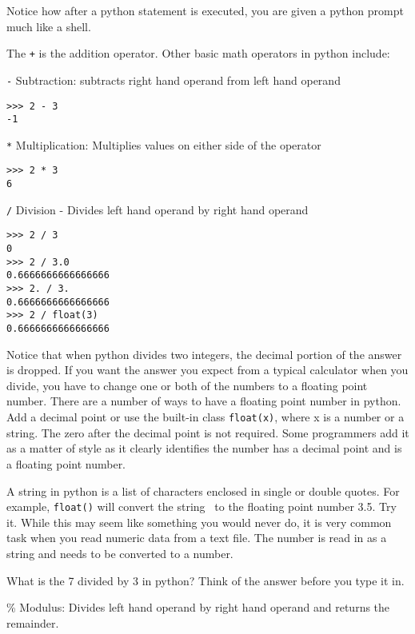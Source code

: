 \documentclass[12pt]{article}
\begin{document}
Notice how after a python statement is executed, you are given a python prompt much like a shell.

The \texttt{+} is the addition operator. Other basic math operators in python include:

\texttt{-} Subtraction: subtracts right hand operand from left hand operand

\begin{lstlisting}[style=bash]
>>> 2 - 3
-1
\end{lstlisting}

\texttt{*} Multiplication: Multiplies values on either side of the operator

\begin{lstlisting}[style=bash]
>>> 2 * 3
6
\end{lstlisting}


\texttt{/} Division - Divides left hand operand by right hand operand

\begin{lstlisting}[style=bash]
>>> 2 / 3
0
>>> 2 / 3.0
0.6666666666666666
>>> 2. / 3.
0.6666666666666666
>>> 2 / float(3)
0.6666666666666666
\end{lstlisting}

Notice that when python divides two integers, the decimal portion of the answer is dropped. If you want the answer you expect from a typical calculator when you divide, you have to change one or both of the numbers to a floating point number. There are a number of ways to have a floating point number in python. Add a decimal point or use the built-in class \texttt{float(x)}, where x is a number or a string. The zero after the decimal point is not required. Some programmers add it as a matter of style as it clearly identifies the number has a decimal point and is a floating point number.

A string in python is a list of characters enclosed in single or double quotes. For example, \texttt{float(\textquotesingle)} will convert the string \textquotesingle $\,$ to the floating point number 3.5. Try it. While this may seem like something you would never do, it is very common task when you read numeric data from a text file. The number is read in as a string and needs to be converted to a number. 

What is the 7 divided by 3 in python? Think of the answer before you type it in. 

\% Modulus: Divides left hand operand by right hand operand and returns the remainder.
\end{document}
